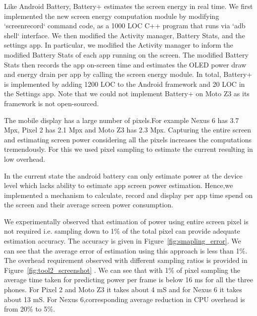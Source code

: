 Like Android Battery, Battery+ estimates the screen energy in real
time. 
We first implemented the new screen energy computation module 
by modifying {\small `screenrecord`} command code,
as a 1000 LOC C++ program that runs via {\small `adb shell`} interface.
We then modified the Activity manager, Battery Stats, and the settings app.
In particular, we modified the Activity manager to
inform the modified Battery Stats     of each app running on the screen.
The modified Battery Stats then records the app on-screen time and estimates
the OLED power draw and energy drain per app by calling the screen energy module.
In total, Battery+ is implemented by adding 1200 LOC to
the Android framework and 20 LOC in the Settings app.
Note that we could not implement Battery+ on Moto Z3 as
its framework is not open-sourced.


The mobile display has a large number of pixels.For example Nexus 6
has 3.7 Mpx, Pixel 2 has 2.1 Mpx and Moto Z3 has 2.3 Mpx.
Capturing the entire screen and estimating screen power considering all
the pixels increases the computations tremendously.
For this we used pixel sampling to estimate the current resulting in low
overhead.

In the current state the android battery can only estimate power at the device
level which lacks ability to estimate  app screen power estimation.
Hence,we  implemented a mechanism to calculate, record and display per
app time spend on the screen and their average screen power consumption.

We experimentally observed that estimation of power using entire
screen pixel is not required i.e.  sampling down to 1\% of the total
pixel can provide adequate estimation accuracy.  The accuracy is given
in Figure~\ref{fig:smapling_error}.  We can see that the average error
of estimation using this approach is less than 1\%.  The overhead
requirement observed with different sampling ratios is provided in
Figure~\ref{fig:tool2_screenshot} . We can see that with 1\% of pixel
sampling the average time taken for predicting power per frame is
below 16 ms for all the three phones. For Pixel 2 and Moto Z3 it takes
about 4 mS and for Nexus 6 it takes about 13 mS. For Nexus
6,corresponding average reduction in CPU overhead is from 20\% to 5\%.


